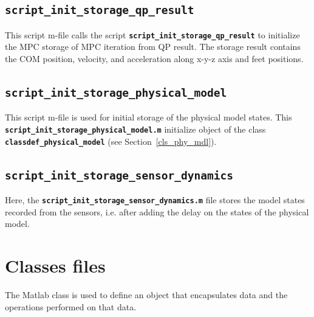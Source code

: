 \documentclass[12pt,oneside,notitlepage,abstracton,a4paper]{scrartcl}
\begin{document}
\subsection{\textbf{\texttt{script\_init\_storage\_qp\_result}}}
This script m-file calls the script \textbf{\texttt{script\_init\_storage\_qp\_result}} to initialize the MPC storage of MPC iteration from QP result. The storage result contains the COM position, velocity, and acceleration along x-y-z axis and feet positions.
\subsection{\textbf{\texttt{script\_init\_storage\_physical\_model}}}
This script m-file is used for initial storage of the physical model states. This\\ {\textbf{\texttt{script\_init\_storage\_physical\_model.m}}}  initialize object of the class \\{\textbf{\texttt{classdef\_physical\_model}}} (see Section~\ref{cls_phy_mdl}).  


\subsection{\textbf{\texttt{script\_init\_storage\_sensor\_dynamics}}} 
Here, the \textbf{\texttt{script\_init\_storage\_sensor\_dynamics.m}} file stores the model states recorded from the sensors, i.e. after adding the delay on the states of the physical model. %
\nopagebreak
\pagebreak 
\section{Classes files} The Matlab class is used to define an object that encapsulates data and the operations performed on that data. 
\end{document}

